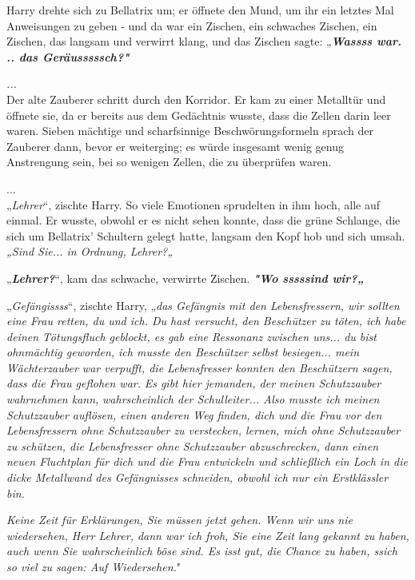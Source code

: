 {Harry drehte sich zu Bellatrix um; er öffnete den Mund, um ihr ein letztes Mal Anweisungen zu geben - und da war ein Zischen, ein schwaches Zischen, ein Zischen, das langsam und verwirrt klang, und das Zischen sagte: „\textbf{\emph{Wassss war.\\ .. das Geräusssssch?"}}

\hfill\break \emph{...}\\ Der alte Zauberer schritt durch den Korridor. Er kam zu einer Metalltür und öffnete sie, da er bereits aus dem Gedächtnis wusste, dass die Zellen darin leer waren. Sieben mächtige und scharfsinnige Beschwörungsformeln sprach der Zauberer dann, bevor er weiterging; es würde insgesamt wenig genug Anstrengung sein, bei so wenigen Zellen, die zu überprüfen waren.

...\\ „\emph{Lehrer}“, zischte Harry. So viele Emotionen sprudelten in ihm hoch, alle auf einmal. Er wusste, obwohl er es nicht sehen konnte, dass die grüne Schlange, die sich um Bellatrix' Schultern gelegt hatte, langsam den Kopf hob und sich umsah.\\ \emph{„Sind Sie... in Ordnung, Lehrer?„}

„\textbf{\emph{Lehrer?}}“, kam das schwache, verwirrte Zischen. \textbf{\emph{"Wo sssssind wir?„}}

„\emph{Gefängissss}“, zischte Harry, „\emph{das Gefängnis mit den Lebensfressern, wir sollten eine Frau retten, du und ich. Du hast versucht, den Beschützer zu töten, ich habe deinen Tötungsfluch geblockt, es gab eine Ressonanz zwischen uns... du bist ohnmächtig geworden, ich musste den Beschützer selbst besiegen... mein Wächterzauber war verpufft, die Lebensfresser konnten den Beschützern sagen, dass die Frau geflohen war.} \emph{Es gibt hier jemanden, der meinen Schutzzauber wahrnehmen kann,} \emph{wahrscheinlich der Schulleiter... Also musste ich meinen Schutzzauber auflösen, einen anderen Weg finden, dich und die Frau vor den Lebensfressern ohne Schutzzauber zu verstecken, lernen, mich ohne Schutzzauber zu schützen, die Lebensfresser ohne Schutzzauber abzuschrecken, dann einen neuen Fluchtplan für dich und die Frau entwickeln und schließlich ein Loch in die dicke Metallwand des Gefängnisses schneiden, obwohl ich nur ein Erstklässler bin.}

\emph{Keine Zeit für Erklärungen, Sie müssen jetzt gehen. Wenn wir uns nie wiedersehen, Herr Lehrer, dann war ich froh, Sie eine Zeit lang gekannt zu haben, auch wenn Sie wahrscheinlich böse sind. Es isst gut, die Chance zu haben, ssich so viel zu sagen: Auf Wiedersehen.}"

}
